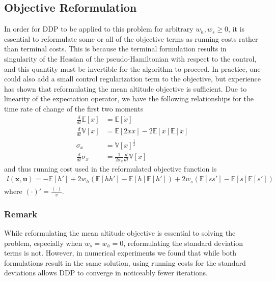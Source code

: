 \documentclass[journal ]{new-aiaa}
\newcommand{\state}{\ensuremath{\mathbf{x}}}
\newcommand{\control}{\ensuremath{\mathbf{u}}}
\newcommand{\E}[1]{\mathbb{E}\left[#1\right]}
\newcommand{\V}[1]{\mathbb{V}[#1]}
\begin{document}
\subsection*{Objective Reformulation}
In order for DDP to be applied to this problem for arbitrary $w_h,w_s\ge 0$, it is essential to reformulate some or all of the objective terms as running costs rather than terminal costs. This is because the terminal formulation results in singularity of the Hessian of the pseudo-Hamiltonian with respect to the control, and this quantity must be invertible for the algorithm to proceed. In practice, one could also add a small control regularization term to the objective, but experience has shown that reformulating the mean altitude objective is sufficient. Due to linearity of the expectation operator, we have the following relationships for the time rate of change of the first two moments
\begin{align}
\frac{d }{d t}\E{x} &= \E{\dot{x}} \\
\frac{d }{d t}\V{x} &= \E{2x\dot{x}} - 2\E{x}\E{\dot{x}} \\
\sigma_x &= \V{x}^{\frac{1}{2}} \\
\frac{d }{d t}\sigma_x &= \frac{1}{2\sigma_x}\frac{d }{d t}\V{x}
\end{align}
and thus running cost used in the reformulated objective function is 
\begin{align}
l(\state,\control) = -\E{h'} +  2w_h(\E{hh'}-\E{h}\E{h'}) + 2w_s(\E{ss'}-\E{s}\E{s'})
\end{align}
where $(\cdot)' = \frac{\dot{(\cdot)}}{\dot{v}}$.

\subsubsection*{Remark} While reformulating the mean altitude objective is essential to solving the problem, especially when $w_s=w_h=0$, reformulating the standard deviation terms is not. However, in numerical experiments we found that while both formulations result in the same solution, using running costs for the standard deviations allows DDP to converge in noticeably fewer iterations.
\end{document}
